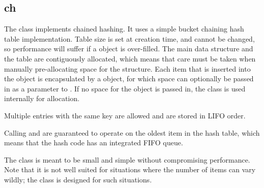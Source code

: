 %
%
%
%
%              

\subsection{ch}
\label{ch}

The  class implements chained hashing.  It uses a simple bucket
chaining hash table implementation.  Table size is set at creation time, and
cannot be changed, so performance will suffer if a  object is
over-filled.  The main  data structure and the table are
contiguously allocated, which means that care must be taken when manually
pre-allocating space for the structure.  Each item that is inserted into the
 object is encapsulated by a  object, for which
space can optionally be passed in as a parameter to .  If no
space for the  object is passed in, the  class is
used internally for allocation.

Multiple entries with the same key are allowed and are stored in LIFO order.

Calling  and  are
guaranteed to operate on the oldest item in the hash table, which means that the
hash code has an integrated FIFO queue.

The  class is meant to be small and simple without compromising
performance.  Note that it is not well suited for situations where the number of
items can vary wildly; the  class is designed for
such situations.

